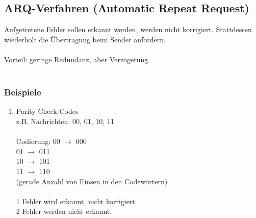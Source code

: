 \subsection{ARQ-Verfahren (Automatic Repeat Request)}
Aufgetretene Fehler sollen erkannt werden, werden nicht korrigiert. Stattdessen  wiederholt die \"Ubertragung beim Sender anfordern.\\
\\
Vorteil: geringe Redundanz, aber Verz\"ogerung.\\
\\
\subsubsection{Beispiele}
\begin{enumerate}
\item Parity-Check-Codes\\
z.B. Nachrichten: 00, 01, 10, 11\\
\\
Codierung: 00 $\rightarrow$ 000\\
01 $\rightarrow$ 011\\
10 $\rightarrow$ 101\\
11 $\rightarrow$ 110\\
(gerade Anzahl von Einsen in den Codew\"ortern)\\
\\
1 Fehler wird erkannt, nicht korrigiert.\\
2 Fehler werden nicht erkannt.


\end{enumerate}
